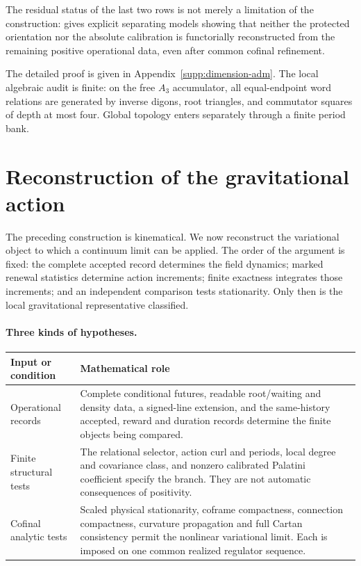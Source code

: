 \documentclass[11pt]{article}
\numberwithin{equation}{section}
\theoremstyle{definition}
\theoremstyle{remark}
\begin{document}
The residual status of the last two rows is not merely a limitation of the
construction:  gives explicit
separating models showing that neither the protected orientation nor the
absolute calibration is functorially reconstructed from the remaining
positive operational data, even after common cofinal refinement.

The detailed proof is given in Appendix~\ref{supp:dimension-adm}.  The local algebraic audit is
finite: on the free $A_3$ accumulator, all equal-endpoint word relations are
generated by inverse digons, root triangles, and commutator squares of depth at
most four.  Global topology enters separately through a finite period bank.


\section{Reconstruction of the gravitational action}
\label{sec:einstein-dynamics}

The preceding construction is kinematical. We now reconstruct the
variational object to which a continuum limit can be applied. The order
of the argument is fixed: the complete accepted record determines the
field dynamics; marked renewal statistics determine action increments;
finite exactness integrates those increments; and an independent
comparison tests stationarity. Only then is the local gravitational
representative classified.

\paragraph{Three kinds of hypotheses.}
\begin{center}
\small
\begin{tabularx}{\linewidth}{@{}p{.20\linewidth}X@{}}
\toprule
Input or condition & Mathematical role\\
\midrule
Operational records & Complete conditional futures, readable root/waiting
and density data, a signed-line extension, and the same-history accepted,
reward and duration records determine the finite objects being compared.\\
Finite structural tests & The relational selector, action curl and periods,
local degree and covariance class, and nonzero calibrated Palatini coefficient
specify the branch. They are not automatic consequences of positivity.\\
Cofinal analytic tests & Scaled physical stationarity, coframe compactness,
connection compactness, curvature propagation and full Cartan consistency
permit the nonlinear variational limit. Each is imposed on one common
realized regulator sequence.\\
\bottomrule
\end{tabularx}
\end{center}
\end{document}
